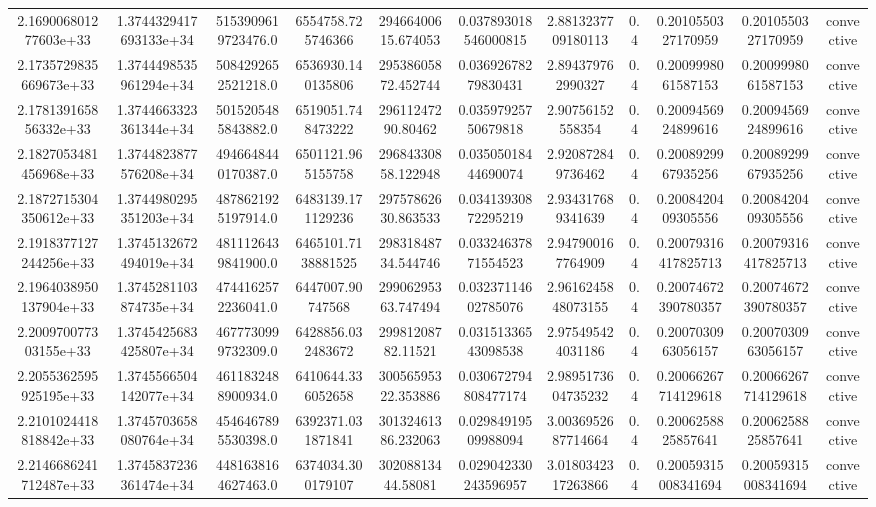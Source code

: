 \begin{table}
\begin{tabular}{ccccccccccc}
2.169006801277603e+33 & 1.3744329417693133e+34 & 5153909619723476.0 & 6554758.725746366 & 29466400615.674053 & 0.037893018546000815 & 2.8813237709180113 & 0.4 & 0.2010550327170959 & 0.2010550327170959 & convective \\
2.1735729835669673e+33 & 1.3744498535961294e+34 & 5084292652521218.0 & 6536930.140135806 & 29538605872.452744 & 0.03692678279830431 & 2.894379762990327 & 0.4 & 0.2009998061587153 & 0.2009998061587153 & convective \\
2.178139165856332e+33 & 1.3744663323361344e+34 & 5015205485843882.0 & 6519051.748473222 & 29611247290.80462 & 0.03597925750679818 & 2.90756152558354 & 0.4 & 0.2009456924899616 & 0.2009456924899616 & convective \\
2.1827053481456968e+33 & 1.3744823877576208e+34 & 4946648440170387.0 & 6501121.965155758 & 29684330858.122948 & 0.03505018444690074 & 2.920872849736462 & 0.4 & 0.2008929967935256 & 0.2008929967935256 & convective \\
2.1872715304350612e+33 & 1.3744980295351203e+34 & 4878621925197914.0 & 6483139.171129236 & 29757862630.863533 & 0.03413930872295219 & 2.934317689341639 & 0.4 & 0.2008420409305556 & 0.2008420409305556 & convective \\
2.1918377127244256e+33 & 1.3745132672494019e+34 & 4811126439841900.0 & 6465101.7138881525 & 29831848734.544746 & 0.03324637871554523 & 2.947900167764909 & 0.4 & 0.20079316417825713 & 0.20079316417825713 & convective \\
2.1964038950137904e+33 & 1.3745281103874735e+34 & 4744162572236041.0 & 6447007.90747568 & 29906295363.747494 & 0.03237114602785076 & 2.9616245848073155 & 0.4 & 0.20074672390780357 & 0.20074672390780357 & convective \\
2.200970077303155e+33 & 1.3745425683425807e+34 & 4677730999732309.0 & 6428856.032483672 & 29981208782.11521 & 0.03151336543098538 & 2.975495424031186 & 0.4 & 0.2007030963056157 & 0.2007030963056157 & convective \\
2.2055362595925195e+33 & 1.3745566504142077e+34 & 4611832488900934.0 & 6410644.336052658 & 30056595322.353886 & 0.030672794808477174 & 2.9895173604735232 & 0.4 & 0.20066267714129618 & 0.20066267714129618 & convective \\
2.2101024418818842e+33 & 1.3745703658080764e+34 & 4546467895530398.0 & 6392371.031871841 & 30132461386.232063 & 0.02984919509988094 & 3.0036952687714664 & 0.4 & 0.2006258825857641 & 0.2006258825857641 & convective \\
2.2146686241712487e+33 & 1.3745837236361474e+34 & 4481638164627463.0 & 6374034.300179107 & 30208813444.58081 & 0.029042330243596957 & 3.0180342317263866 & 0.4 & 0.20059315008341694 & 0.20059315008341694 & convective \\

\end{tabular}
\end{table}
